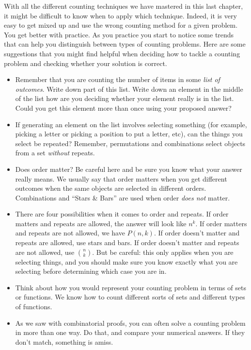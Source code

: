 \documentclass[10pt,]{book}
\theoremstyle{plain}
\theoremstyle{definition}
\theoremstyle{definition}
\theoremstyle{definition}
\numberwithin{equation}{section}
\begin{document}
      With all the different counting techniques we have mastered in this last chapter, it might be difficult to know when to apply which technique. Indeed, it is very easy to get mixed up and use the wrong counting method for a given problem. You get better with practice. As you practice you start to notice some trends that can help you distinguish between types of counting problems. Here are some suggestions that you might find helpful when deciding how to tackle a counting problem and checking whether your solution is correct.
\leavevmode%
\begin{itemize}[label=\textbullet]
\item{}
          Remember that you are counting the number of items in some \emph{list of outcomes}. Write down part of this list. Write down an element in the middle of the list \textendash{} how are you deciding whether your element really is in the list. Could you get this element more than once using your proposed answer?
\item{}
          If generating an element on the list involves selecting something (for example, picking a letter or picking a position to put a letter, etc), can the things you select be repeated? Remember, permutations and combinations select objects from a set \emph{without} repeats.
\item{}
          Does order matter? Be careful here and be sure you know what your answer really means. We usually say that order matters when you get different outcomes when the same objects are selected in different orders. Combinations and ``Stars \& Bars'' are used when order \emph{does not} matter.
\item{}
          There are four possibilities when it comes to order and repeats. If order matters and repeats are allowed, the answer will look like \(n^k\). If order matters and repeats are not allowed, we have \(P(n,k)\). If order doesn't matter and repeats are allowed, use stars and bars. If order doesn't matter and repeats are not allowed, use \({n\choose k}\). But be careful: this only applies when you are selecting things, and you should make sure you know exactly what you are selecting before determining which case you are in.
\item{}
          Think about how you would represent your counting problem in terms of sets or functions. We know how to count different sorts of sets and different types of functions.
\item{}
          As we saw with combinatorial proofs, you can often solve a counting problem in more than one way. Do that, and compare your numerical answers. If they don't match, something is amiss.
\end{itemize}
\par
\end{document}
